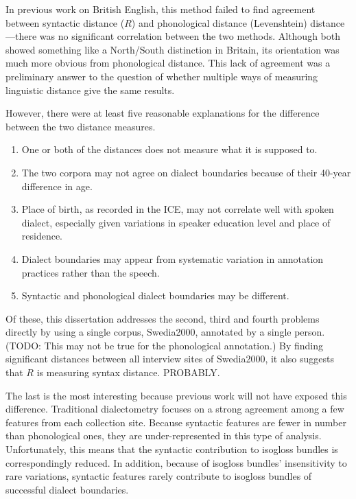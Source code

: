 In previous work on British English, this method failed to find
agreement between syntactic distance ($R$) and phonological distance
(Levenshtein) distance---there was no
significant correlation between the two methods. Although both showed
something like a North/South distinction in Britain, its orientation was much more
obvious from phonological distance. This lack of agreement was a
preliminary answer to the question of whether multiple
ways of measuring linguistic distance give the same results.

However, there were at least five reasonable explanations for the difference
between the two distance measures.

\begin{enumerate}
\item One or both of the distances does not measure what it is supposed to.
\item The two corpora may not agree on dialect boundaries because of
  their 40-year difference in age.
\item Place of birth, as recorded in the ICE, may not correlate well
  with spoken dialect, especially given variations in speaker
  education level and place of residence.
\item Dialect boundaries may appear from systematic variation in
  annotation practices rather than the speech.
\item Syntactic and phonological dialect boundaries may be different.
\end{enumerate}

Of these, this dissertation addresses the second, third and fourth
problems directly by using a single corpus, Swedia2000, annotated by a single
person. (TODO: This may not be true for the phonological annotation.)
By finding significant distances between all interview sites of
Swedia2000, it also suggests that $R$ is measuring syntax
distance. PROBABLY.

The last is the most interesting because previous work will not have
exposed this difference. Traditional dialectometry focuses on a strong
agreement among a few features from each collection site. Because
syntactic features are fewer in number than phonological ones, they
are under-represented in this type of analysis. Unfortunately, this
means that the syntactic contribution to isogloss bundles is
correspondingly reduced. In addition, because of isogloss bundles'
insensitivity to rare variations, syntactic features rarely contribute
to isogloss bundles of successful dialect boundaries.


